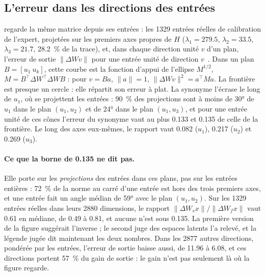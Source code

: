 \begin{figure}[tbp]
\centering
\GrapheLatentsRangee
{}
\label{fig:t3-lat-rangee}
\end{figure}

\subsection{L'erreur dans les directions des entrées}\label{t3sno:sec:nuage}

 regarde la même matrice depuis ses entrées : les \num{1329} entrées réelles de calibration de l'expert, projetées sur les premiers axes propres de $H$ ($\lambda_1 = \num{279.5}$, $\lambda_2 = \num{33.5}$, $\lambda_3 = \num{21.7}$, \SI{28.2}{\percent} de la trace), et, dans chaque direction unité $v$ d'un plan, l'erreur de sortie $\lVert \Delta W v \rVert$ pour une entrée unité de direction $v$ \mes\,\calc. Dans un plan $B = [u_1\ u_k]$, cette courbe est la fonction d'appui de l'ellipse $M^{1/2}$, $M = B^\top \Delta W^\top \Delta W B$ : pour $v = B a$, $\lVert a \rVert = 1$, $\lVert \Delta W v\rVert^2 = a^\top M a$. La frontière est presque un cercle : elle répartit son erreur à plat. La synonyme l'écrase le long de $u_1$, où se projettent les entrées : \SI{90}{\percent} des projections sont à moins de \ang{30} de $u_1$ dans le plan $(u_1, u_2)$ et de \ang{24} dans le plan $(u_1, u_3)$, et pour une entrée unité de ces cônes l'erreur du synonyme vaut au plus \num{0.133} et \num{0.135} de celle de la frontière. Le long des axes eux-mêmes, le rapport vaut \num{0.082} ($u_1$), \num{0.217} ($u_2$) et \num{0.269} ($u_3$).

\paragraph{Ce que la borne de \num{0.135} ne dit pas.} Elle porte sur les \emph{projections} des entrées dans ces plans, pas sur les entrées entières : \SI{72}{\percent} de la norme au carré d'une entrée est hors des trois premiers axes, et une entrée fait un angle médian de \ang{59} avec le plan $(u_1, u_2)$. Sur les \num{1329} entrées réelles dans leurs \num{2880} dimensions, le rapport $\lVert \Delta W_s x\rVert / \lVert \Delta W_f x\rVert$ vaut \num{0.61} en médiane, de \num{0.49} à \num{0.81}, et aucune n'est sous \num{0.135}. La première version de la figure suggérait l'inverse ; le second juge des espaces latents l'a relevé, et la légende jugée dit maintenant les deux nombres. Dans les \num{2877} autres directions, pondérée par les entrées, l'erreur de sortie baisse aussi, de \num{11.96} à \num{6.08}, et ces directions portent \SI{57}{\percent} du gain de sortie : le gain n'est pas seulement là où la figure regarde.

